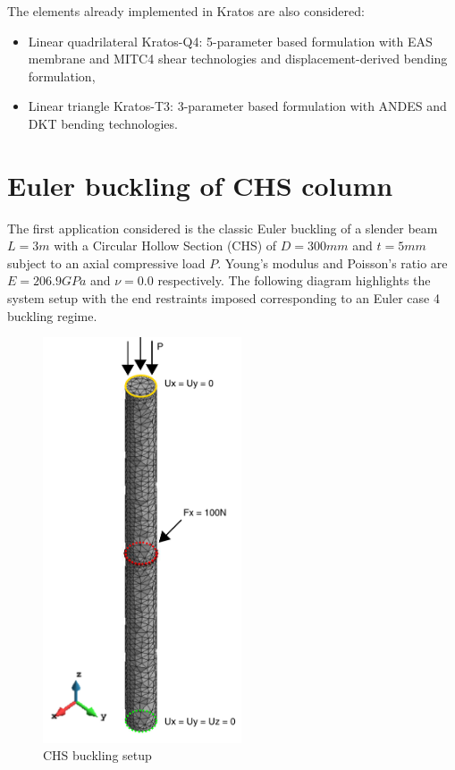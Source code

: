 The elements already implemented in Kratos are also considered:
\begin{itemize}
	\item Linear quadrilateral Kratos-Q4: 5-parameter based formulation with EAS membrane and MITC4 shear technologies and displacement-derived bending formulation,
	\item Linear triangle Kratos-T3: 3-parameter based formulation with ANDES and DKT bending technologies.
\end{itemize}

\section{Euler buckling of CHS column}
\label{applications: Euler buckling of CHS column}
The first application considered is the classic Euler buckling of a slender beam $L=3m$ with a Circular Hollow Section (CHS) of $D = 300mm$ and $t = 5mm$ subject to an axial compressive load $P$. Young's modulus and Poisson's ratio are $E = 206.9GPa$ and $\nu = 0.0$ respectively. The following diagram highlights the system setup with the end restraints imposed corresponding to an Euler case 4 buckling regime. 

\begin{figure}[H]
	\centering
	\includegraphics[height=12cm]{images/chs_buckling_setup}
	\caption{CHS buckling setup}
	\label{fig:chsbucklingsetup}
\end{figure}

